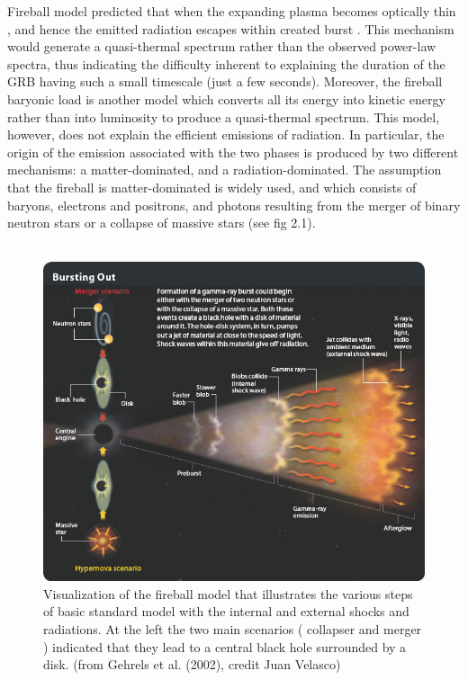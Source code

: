 Fireball model predicted that  when the expanding plasma becomes optically thin ,  and hence the emitted radiation escapes within created  burst . This  mechanism would generate a quasi-thermal spectrum rather than the observed power-law spectra, thus indicating the difficulty inherent to explaining the duration of the GRB having such a small timescale (just a few seconds). Moreover, the fireball baryonic load is another model which converts all its energy into kinetic energy rather than into luminosity to produce a quasi-thermal spectrum. This model, however, does not explain the efficient emissions  of radiation. In particular, the origin of the emission associated with the two phases is produced by two different mechanisms: a matter-dominated, and a radiation-dominated. The  assumption  that  the  fireball is  matter-dominated  is  widely  used, and which consists of baryons, electrons and positrons, and  photons  resulting from  the merger of binary  neutron stars or a collapse of massive stars \citep{10} \citep{15} (see fig 2.1). \\\\ 
\begin{figure}[h]
\begin{center}
\includegraphics[scale=0.5]{Figures/fig5.png}
\caption{Visualization  of  the  fireball  model that illustrates  the various steps of  basic  standard  model  with  the internal  and  external  shocks and  radiations. At  the left  the  two main  scenarios ( collapser and  merger ) indicated  that they  lead  to  a central  black  hole  surrounded by a disk. (from Gehrels et al. (2002), credit Juan Velasco)\citep{13}}
\end{center}
\end{figure} 
